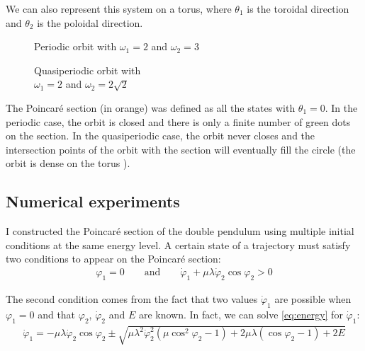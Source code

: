 \documentclass[11 pt]{article}
\begin{document}
We can also represent this system on a torus, where $\theta_1$ is the toroidal direction and $\theta_2$ is the poloidal direction.

\begin{figure}[H]
    \centering
    \begin{minipage}{.5\textwidth}
        \centering
        
        \caption{Periodic orbit with $\omega_1=2$ and $\omega_2=3$}
        \label{fig:poincare_periodic}
    \end{minipage}%
    \begin{minipage}{.5\textwidth}
        \centering
        
        \caption{Quasiperiodic orbit with \\$\omega_1=2$ and $\omega_2 = 2 \sqrt{2}$}
        \label{fig:poincare_quasi}
    \end{minipage}
\end{figure}

The Poincaré section (in orange) was defined as all the states with $\theta_1=0$. In the periodic case, the orbit is closed and there is only a finite number of green dots on the section. In the quasiperiodic case, the orbit never closes and the intersection points of the orbit with the section will eventually fill the circle (the orbit is dense on the torus \cite[p. 279]{strogatz2018nonlinear}).  %

\subsection{Numerical experiments}

I constructed the Poincaré section of the double pendulum using multiple initial conditions at the same energy level. A certain state of a trajectory must satisfy two conditions to appear on the Poincaré section:
\begin{align}
    \varphi_1 = 0 \qquad \text{and} \qquad \dot \varphi_1 + \mu \lambda \dot \varphi_2 \cos{\varphi_2} > 0 \label{eq:condition1}
\end{align}

The second condition comes from the fact that two values $\dot \varphi_1$ are possible when $\varphi_1=0$ and that $\varphi_2$, $\dot \varphi_2$ and $E$ are known. In fact, we can solve \eqref{eq:energy} for $\dot \varphi_1$:
\begin{align*}
    \dot \varphi_1 = -\mu \lambda \dot \varphi_2 \cos{\varphi_2} \pm \sqrt{\mu \lambda^2 \dot \varphi_2^2 \left(\mu \cos^{2}\varphi_2 - 1\right) + 2 \mu \lambda (\cos{\varphi_2} - 1) + 2E}
\end{align*}
\end{document}
